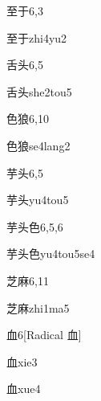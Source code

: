 \begin{entry}{至于}{6,3}
  \begin{phonetics}{至于}{zhi4yu2}
  \end{phonetics}
\end{entry}

\begin{entry}{舌头}{6,5}
  \begin{phonetics}{舌头}{she2tou5}
  \end{phonetics}
\end{entry}

\begin{entry}{色狼}{6,10}
  \begin{phonetics}{色狼}{se4lang2}
  \end{phonetics}
\end{entry}

\begin{entry}{芋头}{6,5}
  \begin{phonetics}{芋头}{yu4tou5}
  \end{phonetics}
\end{entry}

\begin{entry}{芋头色}{6,5,6}
  \begin{phonetics}{芋头色}{yu4tou5se4}
  \end{phonetics}
\end{entry}

\begin{entry}{芝麻}{6,11}
  \begin{phonetics}{芝麻}{zhi1ma5}
  \end{phonetics}
\end{entry}

\begin{entry}{血}{6}[Radical 血]
  \begin{phonetics}{血}{xie3}
  \end{phonetics}
  \begin{phonetics}{血}{xue4}
  \end{phonetics}
\end{entry}

